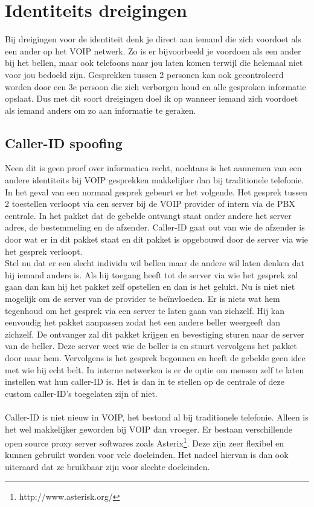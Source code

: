 \documentclass[pdftex,a4paper,12pt,twoside]{report}
\begin{document}
\newpage
\section{Identiteits dreigingen}
Bij dreigingen voor de identiteit denk je direct aan iemand die zich voordoet als een ander op het VOIP netwerk. Zo is er bijvoorbeeld je voordoen als een ander bij het bellen, maar ook telefoons naar jou laten komen terwijl die helemaal niet voor jou bedoeld zijn. Gesprekken tussen 2 personen kan ook gecontroleerd worden door een 3e persoon die zich verborgen houd en alle gesproken informatie opslaat. Dus met dit soort dreigingen doel ik op wanneer iemand zich voordoet als iemand anders om zo aan informatie te geraken.

\subsection{Caller-ID spoofing}
Neen dit is geen proef over informatica recht, nochtans is het aannemen van een andere identiteits bij VOIP gesprekken makkelijker dan bij traditionele telefonie. In het geval van een normaal gesprek gebeurt er het volgende. Het gesprek tussen 2 toestellen verloopt via een server bij de VOIP provider of intern via de PBX centrale. In het pakket dat de gebelde ontvangt staat onder andere het server adres, de bestemmeling en de afzender. Caller-ID gaat out van wie de afzender is door wat er in dit pakket staat en dit pakket is opgebouwd door de server via wie het gesprek verloopt.\\
Stel nu dat er een slecht individu wil bellen maar de andere wil laten denken dat hij iemand anders is. Als hij toegang heeft tot de server via wie het gesprek zal gaan dan kan hij het pakket zelf opstellen en dan is het gelukt. Nu is niet niet mogelijk om de server van de provider te beïnvloeden. Er is niets wat hem tegenhoud om het gesprek via een server te laten gaan van zichzelf. Hij kan eenvoudig het pakket aanpassen zodat het een andere beller weergeeft dan zichzelf. De ontvanger zal dit pakket krijgen en bevestiging sturen naar de server van de beller. Deze server weet wie de beller is en stuurt vervolgens het pakket door naar hem. Vervolgens is het gesprek begonnen en heeft de gebelde geen idee met wie hij echt belt. In interne netwerken is er de optie om mensen zelf te laten instellen wat hun caller-ID is. Het is dan in te stellen op de centrale of deze custom caller-ID's toegelaten zijn of niet.
\\ \\
Caller-ID is niet nieuw in VOIP, het bestond al bij traditionele telefonie. Alleen is het wel makkelijker geworden bij VOIP dan vroeger. Er bestaan verschillende open source proxy server softwares zoals Asterix\footnote{http://www.asterisk.org/}. Deze zijn zeer flexibel en kunnen gebruikt worden voor vele doeleinden. Het nadeel hiervan is dan ook uiteraard dat ze bruikbaar zijn voor slechte doeleinden. 
\end{document}
